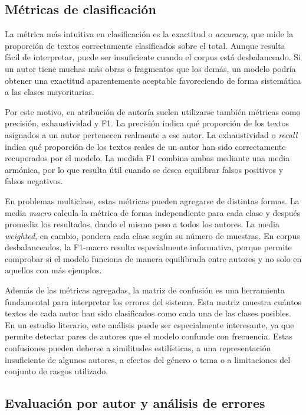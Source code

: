 \documentclass[IB]{TFUOC}%
\begin{document}
\subsection{Métricas de clasificación}

La métrica más intuitiva en clasificación es la exactitud o \textit{accuracy}, que mide la proporción de textos correctamente clasificados sobre el total. Aunque resulta fácil de interpretar, puede ser insuficiente cuando el corpus está desbalanceado. Si un autor tiene muchas más obras o fragmentos que los demás, un modelo podría obtener una exactitud aparentemente aceptable favoreciendo de forma sistemática a las clases mayoritarias.

Por este motivo, en atribución de autoría suelen utilizarse también métricas como precisión, exhaustividad y F1. La precisión indica qué proporción de los textos asignados a un autor pertenecen realmente a ese autor. La exhaustividad o \textit{recall} indica qué proporción de los textos reales de un autor han sido correctamente recuperados por el modelo. La medida F1 combina ambas mediante una media armónica, por lo que resulta útil cuando se desea equilibrar falsos positivos y falsos negativos.

En problemas multiclase, estas métricas pueden agregarse de distintas formas. La media \textit{macro} calcula la métrica de forma independiente para cada clase y después promedia los resultados, dando el mismo peso a todos los autores. La media \textit{weighted}, en cambio, pondera cada clase según su número de muestras. En corpus desbalanceados, la F1-macro resulta especialmente informativa, porque permite comprobar si el modelo funciona de manera equilibrada entre autores y no solo en aquellos con más ejemplos.

Además de las métricas agregadas, la matriz de confusión es una herramienta fundamental para interpretar los errores del sistema. Esta matriz muestra cuántos textos de cada autor han sido clasificados como cada una de las clases posibles. En un estudio literario, este análisis puede ser especialmente interesante, ya que permite detectar pares de autores que el modelo confunde con frecuencia. Estas confusiones pueden deberse a similitudes estilísticas, a una representación insuficiente de algunos autores, a efectos del género o tema o a limitaciones del conjunto de rasgos utilizado.

\subsection{Evaluación por autor y análisis de errores}
\end{document}
